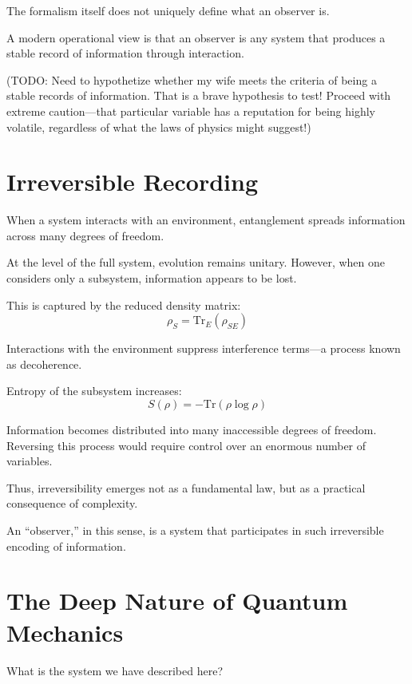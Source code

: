 The formalism itself does not uniquely define what an observer is.

A modern operational view is that an observer is any system that produces a stable record of information through interaction.

(TODO: Need to hypothetize whether my wife meets the criteria of being a stable records of information. 
That is a brave hypothesis to test! Proceed with extreme caution—that particular variable has a reputation for being highly volatile,
regardless of what the laws of physics might suggest!)


\section{Irreversible Recording}

When a system interacts with an environment, entanglement spreads information across many degrees of freedom.

At the level of the full system, evolution remains unitary. However, when one considers only a subsystem, information appears to be lost.

This is captured by the reduced density matrix:
\[
\rho_S = \mathrm{Tr}_E(\rho_{SE})
\]

Interactions with the environment suppress interference terms—a process known as decoherence.

Entropy of the subsystem increases:
\[
S(\rho) = -\mathrm{Tr}(\rho \log \rho)
\]

Information becomes distributed into many inaccessible degrees of freedom. Reversing this process would require control over an enormous number of variables.

Thus, irreversibility emerges not as a fundamental law, but as a practical consequence of complexity.

An “observer,” in this sense, is a system that participates in such irreversible encoding of information.


\section{The Deep Nature of Quantum Mechanics}

What is the system we have described here?

